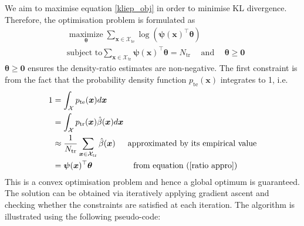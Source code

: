 \documentclass[a4paper,12pt]{article}
\begin{document}
We aim to maximise equation \ref{kliep_obj} in order to minimise KL divergence. Therefore, the optimisation problem is formulated as
\begin{align*}
& \underset{\boldsymbol{\theta}}{\operatorname{maximize}} \sum_{\boldsymbol{x} \in \mathcal{X}_{\mathrm{te}}} \log \left(\boldsymbol{\psi}(\boldsymbol{x})^{\top} \boldsymbol{\theta} \right) \\
& \text{subject to} \sum_{\boldsymbol{x} \in \mathcal{X}_{\mathrm{tr}}}  \boldsymbol{\psi}(\boldsymbol{x})^{\top} \boldsymbol{\theta} = N_{\mathrm{tr}} \hspace{15pt} \text{and} \hspace{15pt}\boldsymbol{\theta} \geq \mathbf{0} 
\end{align*}
$\boldsymbol{\theta} \geq \mathbf{0}$ ensures the density-ratio estimates are non-negative. The first constraint is from the fact that the probability density function ${p}_{\mathrm{te}}(\boldsymbol{x})$ integrates to 1, i.e.
\begin{align*}
1&=\int_{\mathcal{X}} {p}_{\mathrm{te}}(\boldsymbol{x}) d \boldsymbol{x} \\
&=\int_{\mathcal{X}} p_{\mathrm{tr}}(\boldsymbol{x}) \hat{\beta}(\boldsymbol{x}) d \boldsymbol{x} \\
& \approx \frac{1}{N_{\mathrm{tr}}} \sum_{\boldsymbol{x} \in \mathcal{X}_{\mathrm{tr}}} \hat{\beta}(\boldsymbol{x}) \hspace{15pt} \text{approximated by its empirical value} \\
& = \boldsymbol{\psi}(\boldsymbol{x})^{\top} \boldsymbol{\theta} \hspace{50pt} \text{from equation (\ref{ratio appro})}
\end{align*}
This is a convex optimisation problem and hence a global optimum is guaranteed. The solution can be obtained via iteratively applying gradient ascent and checking whether the constraints are satisfied at each iteration. The algorithm is illustrated using the following pseudo-code:
\end{document}
